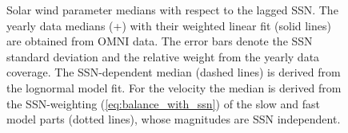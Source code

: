 \begin{figure}
	\caption{Solar wind parameter medians with respect to the lagged SSN. The yearly data medians (+) with their weighted linear fit (solid lines) are obtained from OMNI data. The error bars denote the SSN standard deviation and the relative weight from the yearly data coverage. The SSN-dependent median (dashed lines) is derived from the lognormal model fit. For the velocity the median is derived from the SSN-weighting (\ref{eq:balance_with_ssn}) of the slow and fast model parts (dotted lines), whose magnitudes are SSN independent.}
	\label{fig:OMNI_yearly_BVNTvsSSN_a}
\end{figure}

